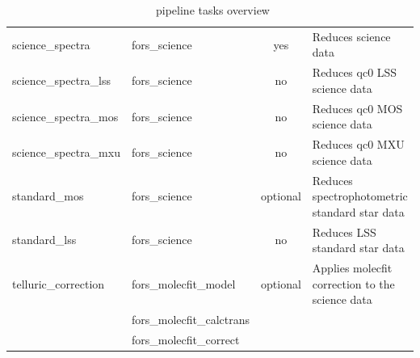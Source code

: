 \begin{table}[htbp]
\begin{tabular}{|l|l|c|p{7cm}|}
science\_spectra & fors\_science   & yes & Reduces science data                      \\
science\_spectra\_lss & fors\_science   & no & Reduces qc0 LSS science data                      \\
science\_spectra\_mos & fors\_science   & no & Reduces qc0 MOS science data                      \\
science\_spectra\_mxu & fors\_science   & no & Reduces qc0 MXU science data                      \\
standard\_mos & fors\_science 	   &optional & Reduces spectrophotometric standard star data \\
standard\_lss & fors\_science	   & no & Reduces LSS standard star data \\
telluric\_correction & fors\_molecfit\_model	& optional   & Applies molecfit correction to the  science data \\
     & fors\_molecfit\_calctrans &    &    \\
     & fors\_molecfit\_correct    &    &    \\
     
\hline
\end{tabular}
\caption{\instname\ pipeline tasks overview}
\end{table}
